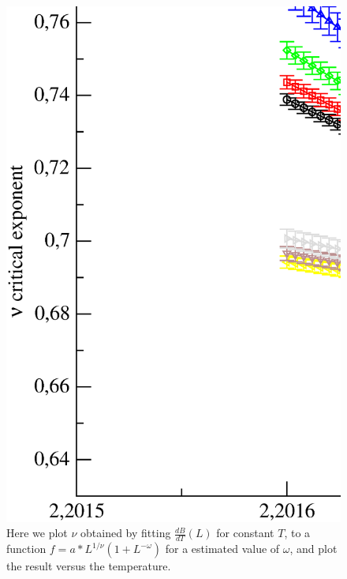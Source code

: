 \begin{figure}[!htpb]
  \centering
  \includegraphics[width=\textwidth]{./plots/3DXY/vsT/nu.eps}
  \caption{Here we plot $\nu$ obtained by fitting $\frac{dB}{dT}(L)$ for constant $T$, to a function $f = a*L^{1/\nu}(1+L^{-\omega})$ for a estimated value of $\omega$, and plot the result versus the temperature. }
\end{figure}

